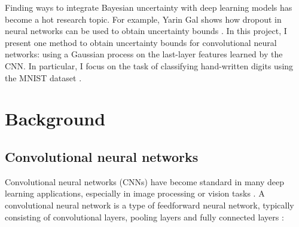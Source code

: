 \documentclass{article}
\begin{document}
Finding ways to integrate Bayesian uncertainty with deep learning models has become a hot research topic. For example, Yarin Gal shows how dropout in neural networks can be used to obtain uncertainty bounds \cite{gal2016dropout}. In this project, I present one method to obtain uncertainty bounds for convolutional neural networks: using a Gaussian process on the last-layer features learned by the CNN. In particular, I focus on the task of classifying hand-written digits using the MNIST dataset \cite{lecun1998gradient}.

\section{Background}
\subsection{Convolutional neural networks}
Convolutional neural networks (CNNs) have become standard in many deep learning applications, especially in image processing or vision tasks \cite{Goodfellow-et-al-2016}. A convolutional neural network is a type of feedforward neural network, typically consisting of convolutional layers, pooling layers and fully connected layers \cite{DBLP:journals/corr/GuWKMSSLWW15}:
\end{document}
